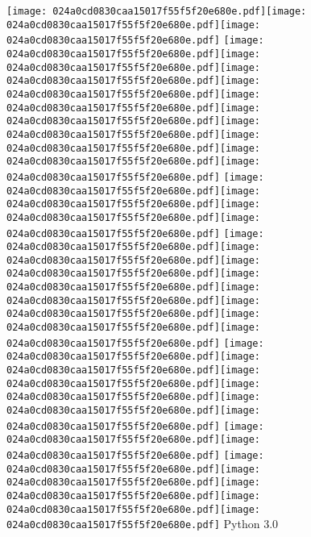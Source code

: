 \documentclass{article}
\newcommand{\origpg}[2]{\texttt{[image: 024a0cd0830caa15017f55f5f20e680e.pdf]}}
\begin{document}
{\vspace{9.781pt} \hspace{31.403pt}\origpg3{120.74pt 250.37pt 131.75pt 266.51pt}\origpg3{131.81pt 250.37pt 139.87pt 266.51pt}\origpg3{139.77pt 250.37pt 147.2pt 266.51pt} \origpg3{154.68pt 250.37pt 162.3pt 266.51pt}\origpg3{162.38pt 250.37pt 173.23pt 266.51pt}\hspace{-0.242pt}\origpg3{172.99pt 250.37pt 181.62pt 266.51pt}\origpg3{181.62pt 250.37pt 189.69pt 266.51pt}\hspace{-0.323pt}\origpg3{189.37pt 250.37pt 197.42pt 266.51pt}\origpg3{197.33pt 250.37pt 205.96pt 266.51pt}\origpg3{205.96pt 250.37pt 213.13pt 266.51pt}\hspace{-0.145pt}\origpg3{212.98pt 250.37pt 221.62pt 266.51pt}\origpg3{221.62pt 250.37pt 230.25pt 266.51pt}\origpg3{230.32pt 250.37pt 237.74pt 266.51pt} \origpg3{245.23pt 250.37pt 253.87pt 266.51pt}\origpg3{253.87pt 250.37pt 261.03pt 266.51pt}\hspace{-0.145pt}\origpg3{260.89pt 250.37pt 268.94pt 266.51pt}\origpg3{268.84pt 250.37pt 277.48pt 266.51pt} \origpg3{284.97pt 250.37pt 292.81pt 266.51pt}\hspace{-0.129pt}\origpg3{292.68pt 250.37pt 300.75pt 266.51pt}\hspace{-0.355pt}\origpg3{300.4pt 250.37pt 308.47pt 266.51pt}\origpg3{308.57pt 250.37pt 315.73pt 266.51pt}\origpg3{315.78pt 250.37pt 323.85pt 266.51pt}\hspace{-0.113pt}\origpg3{323.74pt 250.37pt 331.36pt 266.51pt}\origpg3{331.44pt 250.37pt 339.51pt 266.51pt}\hspace{-0.113pt}\origpg3{339.39pt 250.37pt 348.03pt 266.51pt} \origpg3{355.28pt 250.37pt 363.35pt 266.51pt}\hspace{-0.113pt}\origpg3{363.23pt 250.37pt 370.4pt 266.51pt}\origpg3{370.45pt 250.37pt 378.66pt 266.51pt}\origpg3{378.66pt 250.37pt 386.73pt 266.51pt}\hspace{-0.387pt}\origpg3{386.35pt 250.37pt 393.4pt 266.51pt}\origpg3{393.33pt 250.37pt 404.18pt 266.51pt} \origpg3{411.87pt 250.37pt 420.5pt 266.51pt}\origpg3{420.5pt 250.37pt 427.67pt 266.51pt} \origpg3{435.21pt 250.37pt 442.63pt 266.51pt}\origpg3{442.63pt 250.37pt 449.01pt 266.51pt}\origpg3{448.94pt 250.37pt 459.79pt 266.51pt}\origpg3{459.79pt 250.37pt 467.63pt 266.51pt}\hspace{-0.387pt}\origpg3{467.25pt 250.37pt 474.41pt 266.51pt} Python 3.0 

}
\end{document}
